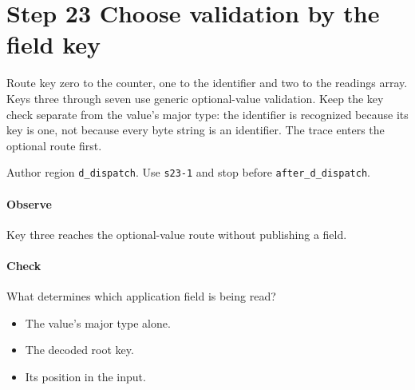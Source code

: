 \section{Step 23 Choose validation by the field key}\label{cbor-s23}
Route key zero to the counter, one to the identifier and two to the readings array. Keys three through seven use generic optional-value validation. Keep the key check separate from the value's major type: the identifier is recognized because its key is one, not because every byte string is an identifier. The trace enters the optional route first.

Author region \texttt{d\_dispatch}. Use \texttt{s23-1} and stop before \texttt{after\_d\_dispatch}.

\paragraph{Observe} Key three reaches the optional-value route without publishing a field.

\paragraph{Check} What determines which application field is being read?
\begin{itemize}
  \item[A.] The value's major type alone.
  \item[B.] The decoded root key.
  \item[C.] Its position in the input.
\end{itemize}
